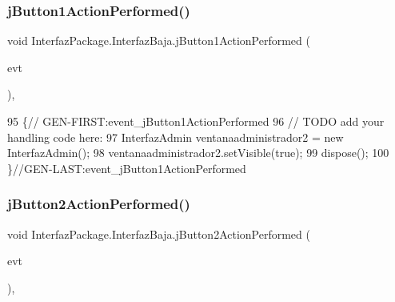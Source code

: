 \mbox{\label{class_interfaz_package_1_1_interfaz_baja_a7e419e5352b3abfcf7466743857e6311}} 
\subsubsection{\texorpdfstring{j\+Button1\+Action\+Performed()}{jButton1ActionPerformed()}}
{\footnotesize\ttfamily void Interfaz\+Package.\+Interfaz\+Baja.\+j\+Button1\+Action\+Performed (\begin{DoxyParamCaption}\item[{java.\+awt.\+event.\+Action\+Event}]{evt }\end{DoxyParamCaption})\hspace{0.3cm}{\ttfamily [inline]}, {\ttfamily [private]}}


\begin{DoxyCode}
95                                                                          \{\textcolor{comment}{//
      GEN-FIRST:event\_jButton1ActionPerformed}
96         \textcolor{comment}{// TODO add your handling code here:}
97         InterfazAdmin ventanaadministrador2 = \textcolor{keyword}{new} InterfazAdmin();
98         ventanaadministrador2.setVisible(\textcolor{keyword}{true});
99         dispose();
100     \}\textcolor{comment}{//GEN-LAST:event\_jButton1ActionPerformed}
\end{DoxyCode}
\mbox{\label{class_interfaz_package_1_1_interfaz_baja_a940a0e0837cd07847853eff8fa207834}} 
\subsubsection{\texorpdfstring{j\+Button2\+Action\+Performed()}{jButton2ActionPerformed()}}
{\footnotesize\ttfamily void Interfaz\+Package.\+Interfaz\+Baja.\+j\+Button2\+Action\+Performed (\begin{DoxyParamCaption}\item[{java.\+awt.\+event.\+Action\+Event}]{evt }\end{DoxyParamCaption})\hspace{0.3cm}{\ttfamily [inline]}, {\ttfamily [private]}}


